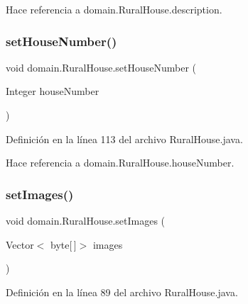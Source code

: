 Hace referencia a domain.\+Rural\+House.\+description.

\mbox{\label{classdomain_1_1_rural_house_afae7f7702581e18517472b1faa29273d}} 
\subsubsection{\texorpdfstring{setHouseNumber()}{setHouseNumber()}}
{\footnotesize\ttfamily void domain.\+Rural\+House.\+set\+House\+Number (\begin{DoxyParamCaption}\item[{Integer}]{house\+Number }\end{DoxyParamCaption})}



Definición en la línea 113 del archivo Rural\+House.\+java.


\begin{DoxyCode}{0}

\end{DoxyCode}


Hace referencia a domain.\+Rural\+House.\+house\+Number.

\mbox{\label{classdomain_1_1_rural_house_aef9348ba3130b35de8e234672eec76cc}} 
\subsubsection{\texorpdfstring{setImages()}{setImages()}}
{\footnotesize\ttfamily void domain.\+Rural\+House.\+set\+Images (\begin{DoxyParamCaption}\item[{Vector$<$ byte\mbox{[}$\,$\mbox{]}$>$}]{images }\end{DoxyParamCaption})}



Definición en la línea 89 del archivo Rural\+House.\+java.


